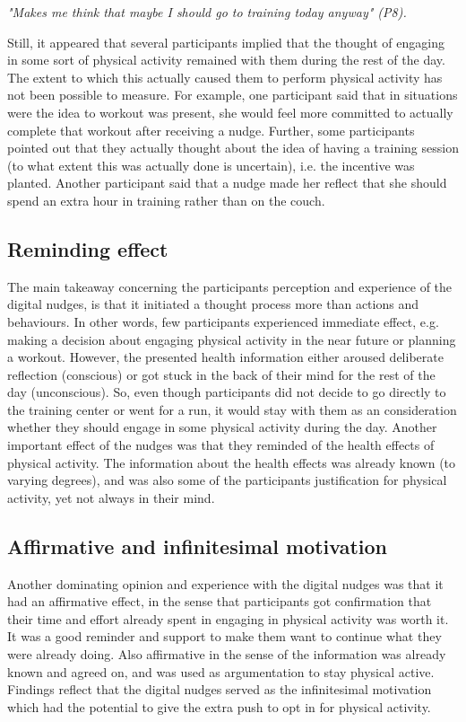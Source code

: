 \textit{"Makes me think that maybe I should go to training today anyway" (P8).}

Still, it appeared that several participants implied that the thought of engaging in some sort of physical activity remained with them during the rest of the day. The extent to which this actually caused them to perform physical activity has not been possible to measure. For example, one participant said that in situations were the idea to workout was present, she would feel more committed to actually complete that workout after receiving a nudge. Further, some participants pointed out that they actually thought about the idea of having a training session (to what extent this was actually done is uncertain), i.e. the incentive was planted. Another participant said that a nudge made her reflect that she should spend an extra hour in training rather than on the couch. 

\subsection{Reminding effect }
The main takeaway concerning the participants perception and experience of the digital nudges, is that it initiated a thought process more than actions and behaviours. In other words, few participants experienced immediate effect, e.g. making a decision about engaging physical activity in the near future or planning a workout. However, the presented health information either aroused deliberate reflection (conscious) or got stuck in the back of their mind for the rest of the day (unconscious). So, even though participants did not decide to go directly to the training center or went for a run, it would stay with them as an consideration whether they should engage in some physical activity during the day. Another important effect of the nudges was that they reminded of the health effects of physical activity. The information about the health effects was already known (to varying degrees), and was also some of the participants justification for physical activity, yet not always in their mind. 

\subsection{Affirmative and infinitesimal motivation}
Another dominating opinion and experience with the digital nudges was that it had an affirmative effect, in the sense that participants got confirmation that their time and effort already spent in engaging in physical activity was worth it. It was a good reminder and support to make them want to continue what they were already doing. Also affirmative in the sense of the information was already known and agreed on, and was used as argumentation to stay physical active. Findings reflect that the digital nudges served as the infinitesimal motivation which had the potential to give the extra push to opt in for  physical activity. 

